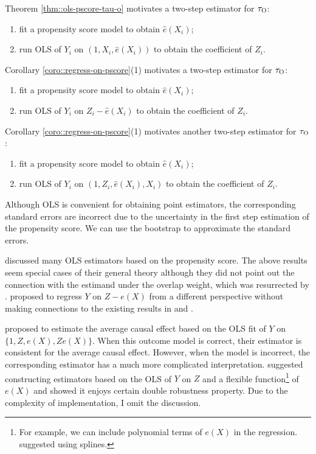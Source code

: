   Theorem \ref{thm::ols-pscore-tau-o} motivates a two-step estimator for $\tau_\textsc{O} $:
\begin{enumerate}
\item
fit a propensity score model to obtain $\hat e(X_i) $;
\item
run OLS of $Y_i$ on $(1,X_i, \hat e(X_i) )$ to obtain the coefficient of $Z_i$. 
\end{enumerate}  
Corollary \ref{coro::regress-on-pscore}(1) motivates a two-step estimator for $\tau_\textsc{O} $: 
\begin{enumerate}
\item
fit a propensity score model to obtain $\hat e(X_i) $;
\item
run OLS of $Y_i$ on $Z_i - \hat e(X_i)$ to obtain the coefficient of $Z_i$.   
\end{enumerate}
Corollary \ref{coro::regress-on-pscore}(1) motivates another two-step estimator for $\tau_\textsc{O} $: 
\begin{enumerate}
\item
fit a propensity score model to obtain $\hat e(X_i) $;
\item
run OLS of $Y_i$ on $(1, Z_i , \hat e(X_i),  X_i ) $ to obtain the coefficient of $Z_i$.   
\end{enumerate}
Although OLS is convenient for obtaining point estimators, the corresponding standard errors are incorrect due to the uncertainty in the first step estimation of the propensity score. We can use the bootstrap to approximate the standard errors. 
  

  
  
 
 
\citet{robins1992estimating} discussed many OLS estimators based on the propensity score. The above results seem special cases of their general theory although they did not point out the connection with the estimand under the overlap weight, which was resurrected by \citet{li2018balancing}. \citet{lee2018simple} proposed to regress $Y$ on $Z-e(X)$ from a different perspective without making connections to the existing results in \citet{robins1992estimating} and \citet{li2018balancing}.


\citet{rosenbaum1983central} proposed to estimate the average causal effect based on the OLS fit of $Y$ on $\{1, Z, e(X), Ze(X)\}$. When this outcome model is correct, their estimator is consistent for the average causal effect. However, when the model is incorrect, the corresponding estimator has a much more complicated interpretation.  \citet{little2004robust} suggested constructing estimators based on the OLS of $Y$ on $Z$ and a flexible function\footnote{For example, we can include polynomial terms of $e(X)$ in the regression. \citet{little2004robust} suggested using splines.} of $e(X)$ and showed it enjoys certain double robustness property.  Due to the complexity of implementation, I omit the discussion. 




